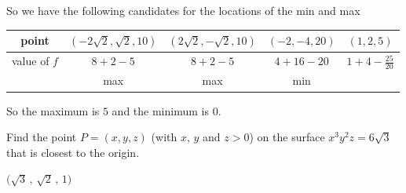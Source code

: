 \begin{solution}
\begin{itemize}
\end{itemize}
So we have the following candidates for the locations of the min and max
\begin{center}
\renewcommand{\arraystretch}{1.3}
     \begin{tabular}{|c|c|c|c|c|}
     \hline
       point
       &$(-2\sqrt{2},\sqrt{2}, 10)$
       &$(2\sqrt{2},-\sqrt{2}, 10)$
       &$(-2,-4,20) $
       &$(1,2,5) $ \\ \hline
       value of $f$
       &$8+2-5$
       &$8+2-5$
       &$4+16-20$
       &$1+4-\frac{25}{20}$\\ \hline
       &max
       &max 
       &min 
       & \\ \hline
     \end{tabular}
\renewcommand{\arraystretch}{1.0}
\end{center}
So the maximum is $5$ and the minimum is $0$.
\end{solution}

\begin{question}[M200 2010D] %
Find the point $P = (x, y, z)$ (with $x$, $y$ and $z> 0$) on the surface $x^3 y^2 z = 6 \sqrt{3}$
that is closest to the origin.
\end{question}

%

\begin{answer}
$\big(\sqrt{3}\,,\,\sqrt{2}\,,\,1\big)$
\end{answer}

